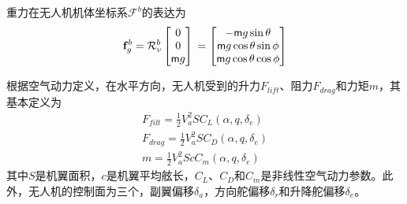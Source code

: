 重力在无人机机体坐标系$\mathcal{F}^b$的表达为
\begin{equation}
\mathbf{f}_g^b =\mathcal{R}^b_v \begin{bmatrix}0  \\ 0  \\ \mathsf{m}g  \end{bmatrix} \\
= \begin{bmatrix} -\mathsf{m} g \sin \theta  \\ \mathsf{m}g \cos \theta \sin \phi  \\ \mathsf{m}g \cos\theta \cos \phi  \end{bmatrix}
\end{equation}

根据空气动力定义，在水平方向，无人机受到的升力$F_{lift}$、阻力$F_{drag}$和力矩$m$，其基本定义为
\begin{align}
F_{filt} = \frac{1}{2} V_a^2SC_L(\alpha, q, \delta_e) \\
F_{drag} = \frac{1}{2} V_a^2SC_D(\alpha, q, \delta_e) \\
m = \frac{1}{2} V_a^2ScC_m(\alpha, q, \delta_e)
\end{align}
其中$S$是机翼面积，$c$是机翼平均舷长，$C_L$、$C_D$和$C_m$是非线性空气动力参数。此外，无人机的控制面为三个，副翼偏移$\delta_a$，方向舵偏移$\delta_r$和升降舵偏移$\delta_e$。

